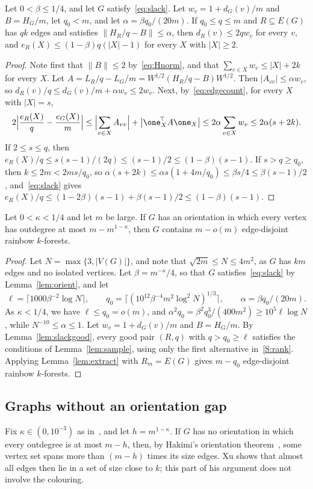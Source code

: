 \begin{lemma}\label{lem:slackgood}
Let $0<\beta\le1/4$, and let $G$ satisfy~\eqref{eq:slack}. Let $w_v=1+d_G(v)/m$ and $B=H_G/m$, let $q_0<m$, and let $\alpha=\beta q_0/(20m)$.
If $q_0\le q\le m$ and $R\subseteq E(G)$ has $qk$ edges and satisfies $\|H_R/q-B\|\le\alpha$, then $d_R(v)\le2qw_v$ for every $v$, and $e_R(X)\le(1-\beta)q(|X|-1)$ for every $X$ with $|X|\ge2$.
\end{lemma}
\begin{proof}
Note first that $\|B\|\le2$ by~\eqref{eq:Hnorm}, and that $\sum_{v\in X}w_v\le|X|+2k$ for every $X$.
Let $A=L_R/q-L_G/m=W^{1/2}(H_R/q-B)W^{1/2}$. Then $|A_{vv}|\le\alpha w_v$, so $d_R(v)/q\le d_G(v)/m+\alpha w_v\le2w_v$.
Next, by~\eqref{eq:edgecount}, for every $X$ with $|X|=s$,
\[
2\Bigl|\frac{e_R(X)}q-\frac{e_G(X)}m\Bigr|\le\Bigl|\sum_{v\in X}A_{vv}\Bigr|+\bigl|\one_X^{\!\top}A\one_X\bigr|\le2\alpha\sum_{v\in X}w_v\le2\alpha(s+2k).
\]
If $2\le s\le q$, then $e_R(X)/q\le s(s-1)/(2q)\le(s-1)/2\le(1-\beta)(s-1)$. If $s>q\ge q_0$, then $k\le2m<2ms/q_0$, so $\alpha(s+2k)\le\alpha s(1+4m/q_0)\le\beta s/4\le\beta(s-1)/2$, and~\eqref{eq:slack} gives $e_R(X)/q\le(1-2\beta)(s-1)+\beta(s-1)/2\le(1-\beta)(s-1)$.
\end{proof}

\begin{theorem}\label{thm:gapcase}
Let $0<\kappa<1/4$ and let $m$ be large. If $G$ has an orientation in which every vertex has outdegree at most $m-m^{1-\kappa}$, then $G$ contains $m-o(m)$ edge-disjoint rainbow $k$-forests.
\end{theorem}
\begin{proof}
Let $N=\max\{3,|V(G)|\}$, and note that $\sqrt{2m}\le N\le4m^2$, as $G$ has $km$ edges and no isolated vertices.
Let $\beta=m^{-\kappa}/4$, so that $G$ satisfies~\eqref{eq:slack} by Lemma~\ref{lem:orient}, and let
\[
\ell=\lceil1000\beta^{-2}\log N\rceil,\qquad q_0=\lceil(10^{12}\beta^{-4}m^2\log^2N)^{1/3}\rceil,\qquad\alpha=\beta q_0/(20m).
\]
As $\kappa<1/4$, we have $\ell\le q_0=o(m)$, and $\alpha^2q_0=\beta^2q_0^3/(400m^2)\ge10^5\ell\log N$, while $N^{-10}\le\alpha\le1$.
Let $w_v=1+d_G(v)/m$ and $B=H_G/m$.
By Lemma~\ref{lem:slackgood}, every good pair $(R,q)$ with $q>q_0\ge\ell$ satisfies the conditions of Lemma~\ref{lem:sample}, using only the first alternative in~\ref{S:rank}.
Applying Lemma~\ref{lem:extract} with $R_m=E(G)$ gives $m-q_0$ edge-disjoint rainbow $k$-forests.
\end{proof}

\subsection{Graphs without an orientation gap}
Fix $\kappa\in(0,10^{-3})$ as in~\cite[Lemma~3.1]{Xu}, and let $h=m^{1-\kappa}$.
If $G$ has no orientation in which every outdegree is at most $m-h$, then, by Hakimi's orientation theorem~\cite{Hak}, some vertex set spans more than $(m-h)$ times its size edges.
Xu shows that almost all edges then lie in a set of size close to $k$; this part of his argument does not involve the colouring.

